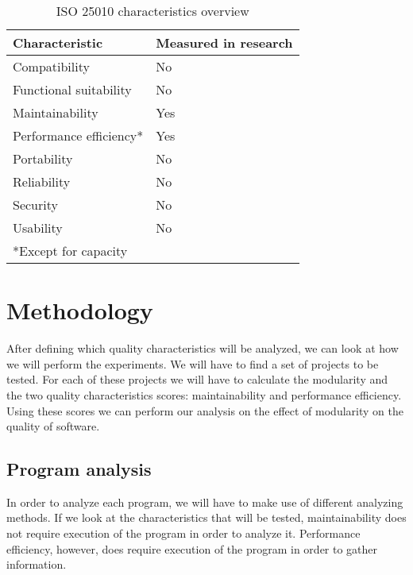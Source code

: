 \documentclass[twoside]{uva-inf-bachelor-thesis}
\begin{document}
\begin{table}[H]
\centering
\caption{ISO 25010 characteristics overview}
\label{table:overview}
\begin{tabular}{ll}
\multicolumn{1}{l|}{\textbf{Characteristic}} & \textbf{Measured in research} \\ \hline
\multicolumn{1}{l|}{Compatibility}           & No                            \\
\multicolumn{1}{l|}{Functional suitability}  & No                            \\
\multicolumn{1}{l|}{Maintainability}         & Yes                           \\
\multicolumn{1}{l|}{Performance efficiency*} & Yes                           \\
\multicolumn{1}{l|}{Portability}             & No                            \\
\multicolumn{1}{l|}{Reliability}             & No                            \\
\multicolumn{1}{l|}{Security}                & No                            \\
\multicolumn{1}{l|}{Usability}               & No                            \\
*Except for capacity                         &                              
\end{tabular}
\end{table}

\section{Methodology}
After defining which quality characteristics will be analyzed, we can look at how we will perform the experiments. We will have to find a set of projects to be tested. For each of these projects we will have to calculate the modularity and the two quality characteristics scores: maintainability and performance efficiency. Using these scores we can perform our analysis on the effect of modularity on the quality of software.

\subsection{Program analysis}
\label{method:analysis}
In order to analyze each program, we will have to make use of different analyzing methods. If we look at the characteristics that will be tested, maintainability does not require execution of the program in order to analyze it. Performance efficiency, however, does require execution of the program in order to gather information.\\
\end{document}
